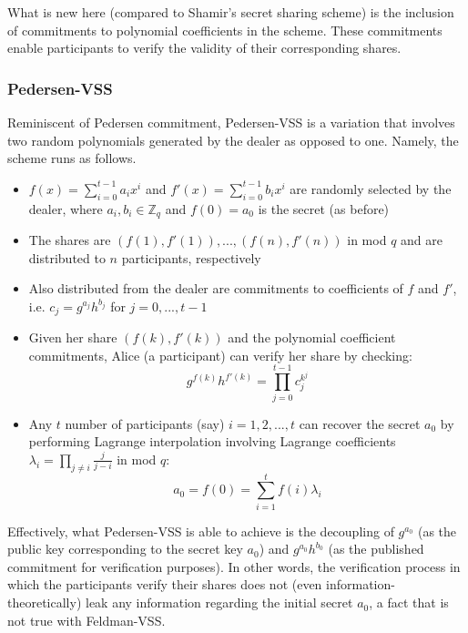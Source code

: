 \documentclass[letterpaper,twocolumn,10pt]{article}
\theoremstyle{definition}
\theoremstyle{remark}
\begin{document}
What is new here (compared to Shamir's secret sharing scheme) is the inclusion of commitments to polynomial coefficients in the scheme. These commitments enable participants to verify the validity of their corresponding shares.

\subsubsection{Pedersen-VSS}
Reminiscent of Pedersen commitment, Pedersen-VSS is a variation that involves two random polynomials generated by the dealer as opposed to one. Namely, the scheme runs as follows.

\begin{itemize}
\item $f(x) = \sum_{i = 0}^{t - 1} a_i x^i$ and $f'(x) = \sum_{i = 0}^{t - 1} b_i x^i$ are randomly selected by the dealer, where $a_i, b_i \in \mathbb{Z}_q$ and $f(0) = a_0$ is the secret (as before)
\item The shares are $(f(1), f'(1)), ..., (f(n), f'(n))$ in mod $q$ and are distributed to $n$ participants, respectively
\item Also distributed from the dealer are commitments to coefficients of $f$ and $f'$, i.e. $c_j = g^{a_j} h^{b_j}$ for $j = 0, ..., t - 1$
\item Given her share $(f(k), f'(k))$ and the polynomial coefficient commitments, Alice (a participant) can verify her share by checking:
$$g^{f(k)} h^{f'(k)} = \prod_{j = 0}^{t - 1} c_j^{k^j}$$
\item Any $t$ number of participants (say) $i = 1, 2, ..., t$ can recover the secret $a_0$ by performing Lagrange interpolation involving Lagrange coefficients $\lambda_i = \prod_{j \neq i} \frac{j}{j - i}$ in mod $q$:
$$a_0 = f(0) = \sum_{i = 1}^{t} f(i) \lambda_i$$
\end{itemize}

Effectively, what Pedersen-VSS is able to achieve is the decoupling of $g^{a_0}$ (as the public key corresponding to the secret key $a_0$) and $g^{a_0} h^{b_0}$ (as the published commitment for verification purposes). In other words, the verification process in which the participants verify their shares does not (even information-theoretically) leak any information regarding the initial secret $a_0$, a fact that is not true with Feldman-VSS.


\end{document}
